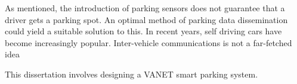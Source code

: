 As mentioned, the introduction of parking sensors does not guarantee that a driver gets a parking spot. An optimal method of parking data dissemination could yield a suitable solution to this. In recent years, self driving cars have become increasingly popular. Inter-vehicle communications is not a far-fetched idea 


This dissertation involves designing a VANET smart parking system. 


